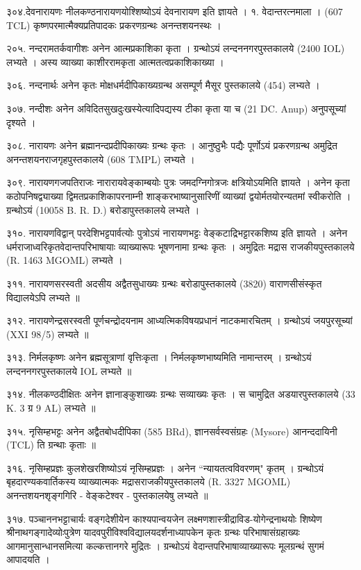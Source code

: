 ३०४.देवनारायणः
नीलकण्ठनारायणयोश्शिष्योऽयं देवनारायण इति ज्ञायते ।
१. वेदान्तरत्नमाला । (607 TCL) कृष्णपरमात्मैक्यप्रतिपादकः प्रकरणग्रन्थः अनन्तशयनस्थः ।

२०५. नन्दरामतर्कवागीशः
अनेन आत्मप्रकाशिका कृता । ग्रन्थोऽयं लन्दननगरपुस्तकालये (2400 IOL) लभ्यते । अस्य व्याख्या काशीररामकृता आत्मतत्वप्रकाशिकाख्या ।

३०६. नन्दनार्थः
अनेन कृतः मोक्षधर्मदीपिकाख्यग्रन्थ असम्पूर्ण मैसूर पुस्तकालये (454) लभ्यते ।

३०७. नन्दीशः
अनेन अविदितसुखदुःखस्येत्यादिपद्यस्य टीका कृता या च (21 DC. Anup) अनुपसूच्यां दृश्यते ।

३०८. नारायणः
अनेन ब्रह्मानन्दप्रदीपिकाख्यः ग्रन्थः कृतः । आनुष्ठुभैः पद्यैः पूर्णोऽयं प्रकरणग्रन्थ अमुद्रित अनन्तशयनराजगृहपुस्तकालये (608 TMPL) लभ्यते ।

३०९. नारायणगजपतिराजः
नारारायवेङ्काम्बयोः पुत्रः जमदग्निगोत्रजः क्षत्रियोऽयमिति ज्ञायते । अनेन कृता कठोपनिषद्व्याख्या द्विमतप्रकाशिकापरनाम्नी शाङ्करभाष्यानुसारिणीं व्याख्यां द्वयोर्मतयोरन्यतमां स्वीकरोति । ग्रन्थोऽयं (10058 B. R. D.) बरोडापुस्तकालये लभ्यते ।

३१०. नारायणविद्वान् 
परदेशिभट्टपार्वत्योः पुत्रोऽयं नारायणभट्टः वेङ्कटाद्रिभट्टारकशिष्य इति ज्ञायते । अनेन धर्मराजाध्वरिकृतवेदान्तपरिभाषायाः व्याख्यारूपः भूषणनामा ग्रन्थः कृतः । अमुद्रितः मद्रास राजकीयपुस्तकालये (R. 1463 MGOML) लभ्यते ।

३११. नारायणसरस्वती
अदसीय अद्वैतसुधाख्यः ग्रन्थः बरोडापुस्तकालये (3820) वाराणसीसंस्कृत विद्यालयेऽपि लभ्यते ॥

३१२. नारायणेन्द्रसरस्वती
पूर्णचन्द्रोदयनाम आध्यत्मिकविषयप्रधानं नाटकमारचितम् । ग्रन्थोऽयं जयपुरसूच्यां (XXI 98/5) लभ्यते ॥

३१३. निर्मलकृष्णः
अनेन ब्रह्मसूत्राणां वृत्तिःकृता । निर्मलकृष्णभाष्यमिति नामान्तरम् । ग्रन्थोऽयं लन्दननगरपुस्तकालये IOL लभ्यते ॥

३१४. नीलकण्ठदीक्षितः
अनेन ज्ञानाङ्कुशाख्यः ग्रन्थः सव्याख्यः कृतः । स चामुद्रित अडयारपुस्तकालये (33 K. 3 ग्र 9 AL) लभ्यते ॥

३१५. नृसिम्हभट्टः
अनेन अद्वैतबोधदीपिका (585 BRd), ज्ञानसर्वस्वसंग्रहः (Mysore) आनन्ददायिनी (TCL) ति ग्रन्थाः कृताः ॥

३१६. नृसिम्हप्रज्ञः
कुलशेखरशिष्योऽयं नृसिम्हप्रज्ञः । अनेन ``न्यायतत्वविवरणम्" कृतम् । ग्रन्थोऽयं बृहदारण्यकवार्तिकस्य व्याख्यात्मकः मद्रासराजकीयपुस्तकालये (R. 3327 MGOML) अनन्तशयनशृङ्गगिरि - वेङ्कटेश्वर - पुस्तकालयेषु लभ्यते ॥

३१७. पञ्चाननभट्टाचार्यः
वङ्गदेशीयेन काश्यपान्वयजेन लक्ष्मणशास्त्रीद्राविड-योगेन्द्रनाथयोः शिष्येण श्रीनाथगङ्गादेव्योःपुत्रेण यादवपुरीविश्वविद्यालयदर्शनाध्यापकेन कृतः ग्रन्थः परिभाषासंग्रहाख्यः आगमानुसान्धानसमित्या कल्कत्तानगरे मुद्रितः । ग्रन्थोऽयं वेदान्तपरिभाषाव्याख्यारूपः मूलग्रन्थं सुगमं आपादयति ।

